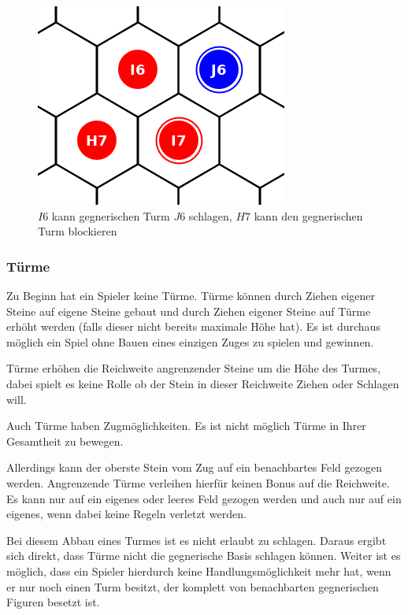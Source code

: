 \begin{figure}[ht]
\begin{center}
\includegraphics[scale=0.3]{graphic/token-kick-block-tower.png}
\end{center}
\caption*{$I6$ kann gegnerischen Turm $J6$ schlagen, $H7$ kann den gegnerischen Turm blockieren}
\end{figure}

\subsubsection*{Türme}
Zu Beginn hat ein Spieler keine Türme. Türme können durch Ziehen eigener Steine auf eigene Steine gebaut und durch Ziehen eigener Steine auf Türme erhöht werden (falls dieser nicht bereits maximale Höhe hat). Es ist durchaus möglich ein Spiel ohne Bauen eines einzigen Zuges zu spielen und gewinnen.

Türme erhöhen die Reichweite angrenzender Steine um die Höhe des Turmes, dabei spielt es keine Rolle ob der Stein in dieser Reichweite Ziehen oder Schlagen will.

Auch Türme haben Zugmöglichkeiten. Es ist nicht möglich Türme in Ihrer Gesamtheit zu bewegen. 

Allerdings kann der oberste Stein vom Zug auf ein benachbartes Feld gezogen werden. Angrenzende Türme verleihen hierfür keinen Bonus auf die Reichweite. Es kann nur auf ein eigenes oder leeres Feld gezogen werden und auch nur auf ein eigenes, wenn dabei keine Regeln verletzt werden.

Bei diesem Abbau eines Turmes ist es nicht erlaubt zu schlagen. Daraus ergibt sich direkt, dass Türme nicht die gegnerische Basis schlagen können. Weiter ist es möglich, dass ein Spieler hierdurch keine Handlungsmöglichkeit mehr hat, wenn er nur noch einen Turm besitzt, der komplett von benachbarten gegnerischen Figuren besetzt ist. 

